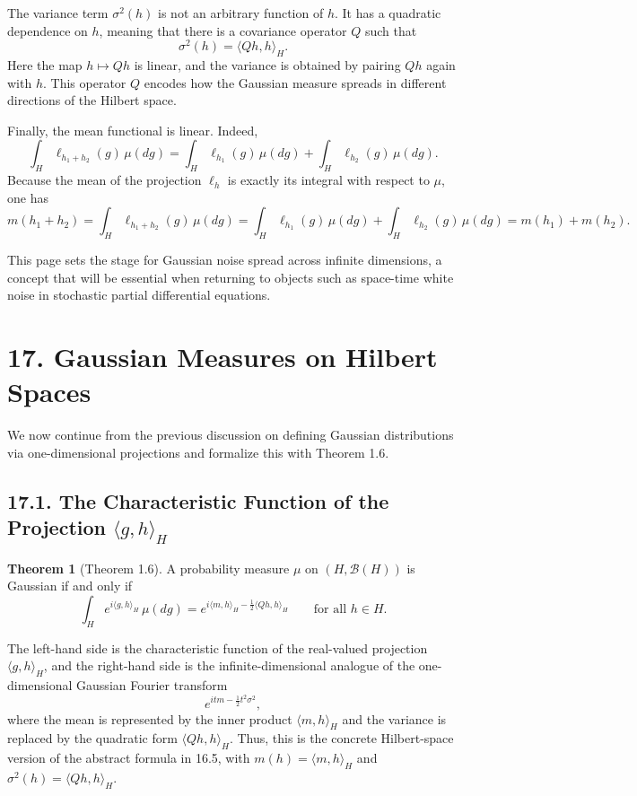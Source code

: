\documentclass[11pt]{article}
\theoremstyle{definition}
\newtheorem{theorem}{Theorem}
\theoremstyle{remark}
\begin{document}
The variance term $\sigma^2(h)$ is not an arbitrary function of $h$. It has a quadratic dependence on $h$, meaning that there is a covariance operator $Q$ such that
\[
\sigma^2(h)=\langle Qh,h\rangle_H.
\]
Here the map $h\mapsto Qh$ is linear, and the variance is obtained by pairing $Qh$ again with $h$. This operator $Q$ encodes how the Gaussian measure spreads in different directions of the Hilbert space.

Finally, the mean functional is linear. Indeed,
\[
\int_H \ell_{h_1+h_2}(g)\,\mu(dg)=\int_H \ell_{h_1}(g)\,\mu(dg)+\int_H \ell_{h_2}(g)\,\mu(dg).
\]
Because the mean of the projection $\ell_h$ is exactly its integral with respect to $\mu$, one has
\[
m(h_1+h_2)
=
\int_H \ell_{h_1+h_2}(g)\,\mu(dg)
=
\int_H \ell_{h_1}(g)\,\mu(dg)+\int_H \ell_{h_2}(g)\,\mu(dg)
=
m(h_1)+m(h_2).
\]

This page sets the stage for Gaussian noise spread across infinite dimensions, a concept that will be essential when returning to objects such as space-time white noise in stochastic partial differential equations.

\section*{17. Gaussian Measures on Hilbert Spaces}
We now continue from the previous discussion on defining Gaussian distributions via one-dimensional projections and formalize this with Theorem 1.6.

\subsection*{17.1. The Characteristic Function of the Projection $\langle g,h\rangle_H$}
\begin{theorem}[Theorem 1.6]
A probability measure $\mu$ on $(H,\mathcal B(H))$ is Gaussian if and only if
\[
\int_H e^{i\langle g,h\rangle_H}\,\mu(dg)=e^{i\langle m,h\rangle_H-\frac12 \langle Qh,h\rangle_H}
\qquad \text{for all } h\in H.
\]
\end{theorem}

The left-hand side is the characteristic function of the real-valued projection $\langle g,h\rangle_H$, and the right-hand side is the infinite-dimensional analogue of the one-dimensional Gaussian Fourier transform
\[
e^{itm-\frac12 t^2\sigma^2},
\]
where the mean is represented by the inner product $\langle m,h\rangle_H$ and the variance is replaced by the quadratic form $\langle Qh,h\rangle_H$.
Thus, this is the concrete Hilbert-space version of the abstract formula in 16.5, with $m(h)=\langle m,h\rangle_H$ and $\sigma^2(h)=\langle Qh,h\rangle_H$.
\end{document}

